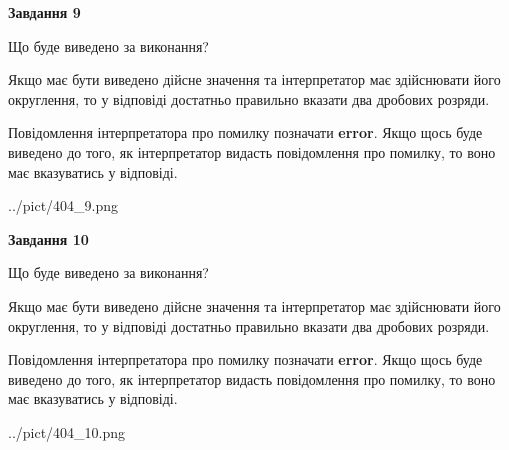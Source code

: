 \documentclass[12pt, ukrainian]{article}
\begin{document}
{\begin {Large}
{\begin {center}\textbf{Завдання 9}\end {center}}\par
Що буде виведено за виконання? \par

Якщо має бути виведено дійсне значення та інтерпретатор має здійснювати його округлення, 
то у відповіді достатньо правильно вказати два дробових розряди.

Повідомлення інтерпретатора про помилку позначати \textbf{error}.
Якщо щось буде виведено до того, як інтерпретатор видасть повідомлення про помилку, 
то воно має вказуватись у відповіді. \par

\begin{center}
	{../pict/404_9.png}
\end{center}
\newpage

{\begin {center}\textbf{Завдання 10}\end {center}}\par
Що буде виведено за виконання? \par

Якщо має бути виведено дійсне значення та інтерпретатор має здійснювати його округлення, 
то у відповіді достатньо правильно вказати два дробових розряди.

Повідомлення інтерпретатора про помилку позначати \textbf{error}.
Якщо щось буде виведено до того, як інтерпретатор видасть повідомлення про помилку, 
то воно має вказуватись у відповіді. \par

\begin{center}
	{../pict/404_10.png}
\end{center}
\newpage

\end {Large}}
\end{document}
